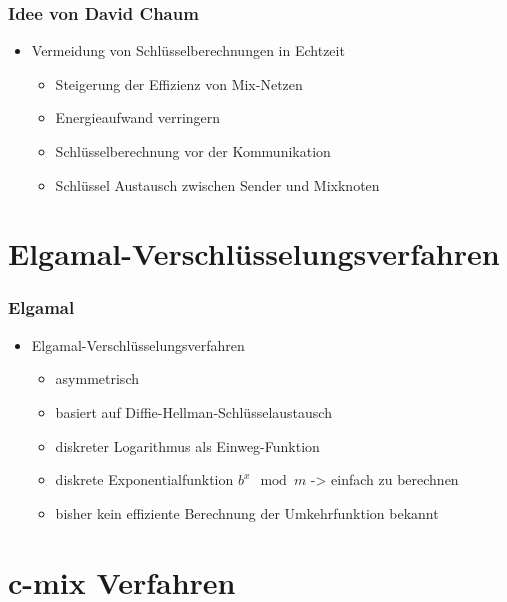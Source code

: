 \documentclass[t, xcolor=dvipsnames]{beamer}
\begin{document}
\begin{frame}
	\frametitle{Idee von David Chaum}
	\begin{itemize}
		\item Vermeidung von Schlüsselberechnungen in Echtzeit 
			\begin{itemize}
				\item Steigerung der Effizienz von Mix-Netzen
				\item Energieaufwand verringern
				\item Schlüsselberechnung vor der Kommunikation
				\item Schlüssel Austausch zwischen Sender und Mixknoten
			\end{itemize}
	\end{itemize}
	\vspace{\fill}
\end{frame}

\section{Elgamal-Verschlüsselungsverfahren}
\begin{frame}
	\frametitle{Elgamal}
	\begin{itemize}
		\item Elgamal-Verschlüsselungsverfahren
			\begin{itemize}
				\item asymmetrisch
				\item basiert auf Diffie-Hellman-Schlüsselaustausch
				\item diskreter Logarithmus als Einweg-Funktion
				\item diskrete Exponentialfunktion $b^x \mod m$ -> einfach zu berechnen
				\item bisher kein effiziente Berechnung der Umkehrfunktion bekannt
			\end{itemize}
	\end{itemize}
	\vspace{\fill}
\end{frame}

\section{c-mix Verfahren} %
\end{document}
